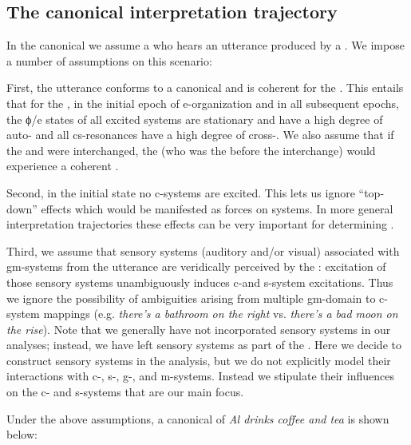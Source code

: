 \subsection{The canonical interpretation trajectory}

In the canonical  we assume a  who hears an utterance produced by a . We impose a number of assumptions on this scenario:

First, the utterance conforms to a canonical  and is coherent for the . This entails that for the , in the initial epoch of e-organization and in all subsequent epochs, the ϕ/e states of all excited systems are stationary and have a high degree of auto- and all cs-resonances have a high degree of cross-. We also assume that if the  and  were interchanged, the  (who was the  before the interchange) would experience a coherent . 

Second, in the initial state no c-systems are excited. This lets us ignore “top-down” effects which would be manifested as  forces on systems. In more general interpretation trajectories these effects can be very important for determining .

Third, we assume that sensory systems (auditory and/or visual) associated with gm-systems from the utterance are veridically perceived by the : excitation of those sensory systems unambiguously induces c-and s-system excitations. Thus we ignore the possibility of ambiguities arising from multiple gm-domain to c-system mappings (e.g. \textit{there’s a bathroom on the right} vs. \textit{there’s a bad moon on the rise}). Note that we generally have not incorporated sensory systems in our analyses; instead, we have left sensory systems as part of the . Here we decide to construct sensory systems in the analysis, but we do not explicitly model their interactions with c-, s-, g-, and m-systems. Instead we stipulate their influences on the c- and s-systems that are our main focus.

Under the above assumptions, a canonical  of \textit{Al drinks coffee and tea} is shown below:

